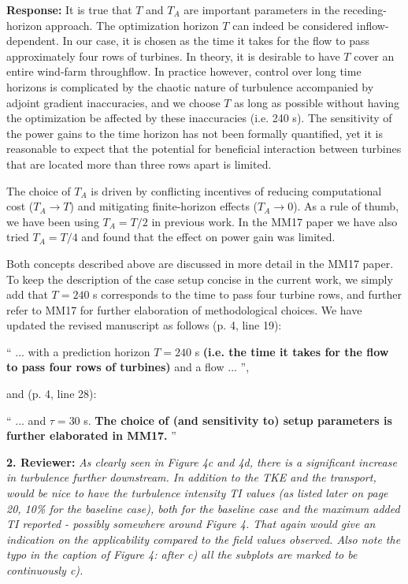 \documentclass[]{article}
\begin{document}
\textbf{Response: } It is true that $T$ and $T_A$ are important parameters in the receding-horizon approach. The optimization horizon $T$ can indeed be considered inflow-dependent. In our case, it is chosen as the time it takes for the flow to pass approximately four rows of turbines. In theory, it is desirable to have $T$ cover an entire wind-farm throughflow. In practice however, control over long time horizons is complicated by the chaotic nature of turbulence accompanied by adjoint gradient inaccuracies, and we choose $T$ as long as possible without having the optimization be affected by these inaccuracies (i.e. 240 s). The sensitivity of the power gains to the time horizon has not been formally quantified, yet it is reasonable to expect that the potential for beneficial interaction between turbines that are located more than three rows apart is limited. 

The choice of $T_A$ is driven by conflicting incentives of reducing computational cost ($T_A \rightarrow T$) and mitigating finite-horizon effects ($T_A \rightarrow 0$). As a rule of thumb, we have been using $T_A = T/2$ in previous work. In the MM17 paper we have also tried $T_A = T/4$ and found that the effect on power gain was limited.

Both concepts described above are discussed in more detail in the MM17 paper. To keep the description of the case setup concise in the current work, we simply add that $T = 240$ s corresponds to the time to pass four turbine rows, and further refer to MM17 for further elaboration of methodological choices. We have updated the revised manuscript as follows (p. 4, line 19): 

``
... with a prediction horizon $T = 240$ s \textbf{(i.e. the time it takes for the flow to pass four rows of turbines)} and a flow ...
'',

and (p. 4, line 28):

`` 
... and $\tau = 30$ s. \textbf{The choice of (and sensitivity to) setup parameters is further elaborated in MM17.}
''

\dotfill

\textbf{2. Reviewer: } \textit{As clearly seen in Figure 4c and 4d, there is a significant increase in turbulence
	further downstream. In addition to the TKE and the transport, would be nice to have the
	turbulence intensity TI values (as listed later on page 20, 10\% for the baseline case),
	both for the baseline case and the maximum added TI reported - possibly somewhere
	around Figure 4. That again would give an indication on the applicability compared to
	the field values observed. Also note the typo in the caption of Figure 4: after c) all the
	subplots are marked to be continuously c).}
\end{document}
